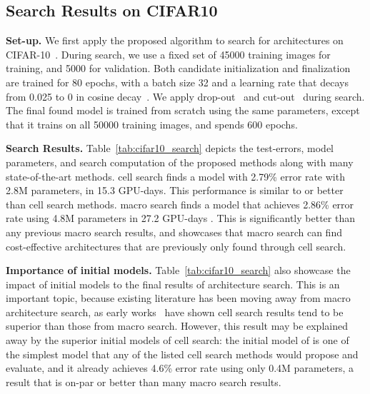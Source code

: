 

\subsection{Search Results on CIFAR10}
\label{sec:experiment_cifar10_search}

\textbf{Set-up.}
We first apply the proposed algorithm to search for architectures on CIFAR-10~\citep{cifar}. During search, we use a fixed set of 45000 training images for training, and 5000 for validation. Both candidate initialization and finalization are trained for 80 epochs, with a batch size 32 and a learning rate that decays from 0.025 to 0 in cosine decay~\citep{cosine_lr}. We apply drop-out~\citep{larsson2016fractalnet} and cut-out~\citep{cutout} during search. The final found model is trained from scratch using the same parameters, except that it trains on all 50000 training images, and spends 600 epochs. 


\textbf{Search Results.} 
Table~\ref{tab:cifar10_search} depicts the test-errors, model parameters, and search computation of the proposed methods along with many state-of-the-art methods.
\Petridish cell search finds a model with 2.79\% error rate with 2.8M parameters, in 15.3 GPU-days. This performance is similar to or better than cell search methods. \Petridish macro search finds a model that achieves 2.86\% error rate using 4.8M parameters in 27.2 GPU-days . This is significantly better than any previous macro search results, 
and showcases that macro search can find cost-effective architectures that are previously only found through cell search. 

\textbf{Importance of initial models.}
Table~\ref{tab:cifar10_search} also showcase the impact of initial models to the final results of architecture search. This is an important topic, because existing literature has been moving away from macro architecture search, as early works~\citep{NASCell,Pham2018EfficientNA,Real2018RegularizedEF} have shown cell search results tend to be superior than those from macro search. However, this result may be explained away by the superior initial models of cell search: the initial model of \Petridish is one of the simplest model that any of the listed cell search methods would propose and evaluate, and it already achieves 4.6\% error rate using only 0.4M parameters, a result that is on-par or better than many macro search results. 


